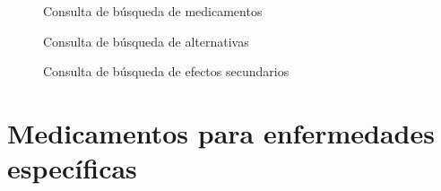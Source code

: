 \documentclass{article}
\begin{document}
\begin{figure}[htbp]
 \fbox
 {
  \begin{minipage}{\textwidth}
   \caption{Consulta de búsqueda de medicamentos}
   \label{src:DrugLookupQuery}
  \end{minipage}
 }
\end{figure}

\begin{figure}[htbp]
 \fbox
 {
  \begin{minipage}{\textwidth}
   \caption{Consulta de búsqueda de alternativas}
   \label{src:AltDrugQuery}
  \end{minipage}
 }
\end{figure}

\begin{figure}[htbp]
 \fbox
 {
  \begin{minipage}{\textwidth}
   \caption{Consulta de búsqueda de efectos secundarios}
   \label{src:SideEffectQuery}
  \end{minipage}
 }
\end{figure}

\section{Medicamentos para enfermedades específicas}
\end{document}
